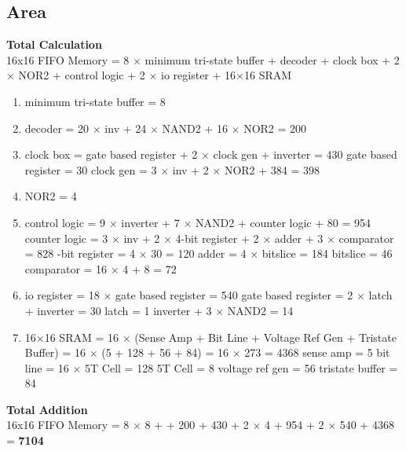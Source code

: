 \documentclass[a4paper]{article}
\begin{document}
\subsection{Area}
\textbf{Total Calculation}\\
16x16 FIFO Memory = 8 $\times$ minimum tri-state buffer + decoder + clock box + 2 $\times$ NOR2 + control logic + 2 $\times$ io register + 16$\times$16 SRAM
\begin{enumerate}
\item minimum tri-state buffer = 8
\item decoder = 20 $\times$ inv + 24 $\times$ NAND2 + 16 $\times$ NOR2 = 200
\item clock box = gate based register + 2 $\times$ clock gen + inverter = 430
\subitem gate based register = 30
\subitem clock gen = 3 $\times$ inv + 2 $\times$ NOR2 + 384 = 398
\item NOR2 = 4
\item control logic = 9 $\times$ inverter + 7 $\times$ NAND2 + counter logic + 80 = 954
\subitem counter logic = 3 $\times$ inv + 2 $\times$ 4-bit register + 2 $\times$ adder + 3 $\times$ comparator = 828
-bit register = 4 $\times$ 30 = 120
\subsubitem adder = 4 $\times$ bitslice = 184
\subsubitem  \hspace{0.5cm} bitslice = 46
\subsubitem comparator = 16 $\times$ 4 + 8 = 72
\item io register = 18 $\times$ gate based register = 540
\subitem gate based register = 2 $\times$ latch + inverter = 30
\subsubitem latch = 1 inverter + 3 $\times$ NAND2 = 14

\item 16$\times$16 SRAM = 16 $\times$ (Sense Amp + Bit Line + Voltage Ref Gen + Tristate Buffer) = 16 $\times$ (5 + 128 + 56 + 84) = 16 $\times$ 273 = 4368
\subitem sense amp = 5
\subitem bit line = 16 $\times$ 5T Cell = 128
\subsubitem 5T Cell = 8
\subitem voltage ref gen = 56
\subitem tristate buffer = 84
\end{enumerate}

\textbf{Total Addition}\\
16x16 FIFO Memory = 8 $\times$ 8 + + 200 + 430 + 2 $\times$ 4 + 954 + 2 $\times$ 540 + 4368 = \textbf{7104}
\end{document}
